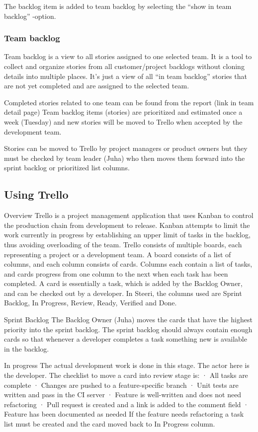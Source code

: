 \documentclass[english]{tktltiki2}
\theoremstyle{definition}
\theoremstyle{remark}
\begin{document}
The backlog item is added to team backlog by selecting the “show in team backlog” -option.

\subsubsection{Team backlog}
Team backlog is a view to all stories assigned to one selected team. It is a tool to collect and organize stories from all customer/project backlogs without cloning details into multiple places. It’s just a view of all “in team backlog” stories that are not yet completed and are assigned to the selected team.

Completed stories related to one team can be found from the report (link in team detail page)
Team backlog items (stories) are prioritized and estimated once a week (Tuesday) and new stories will be moved to Trello when accepted by the development team.

Stories can be moved to Trello by project managers or product owners but they must be checked by team leader (Juha) who then moves them forward into the sprint backlog or prioritized list columns.

\subsection{Using Trello}

Overview
Trello is a project management application that uses Kanban to control the production chain from development to release. Kanban attempts to limit the work currently in progress by establishing an upper limit of tasks in the backlog, thus avoiding overloading of the team. Trello consists of multiple boards, each representing a project or a development team. A board consists of a list of columns, and each column consists of cards. Columns each contain a list of tasks, and cards progress from one column to the next when each task has been completed. A card is essentially a task, which is added by the Backlog Owner, and can be checked out by a developer. In Steeri, the columns used are Sprint Backlog, In Progress, Review, Ready, Verified and Done. 

Sprint Backlog
The Backlog Owner (Juha) moves the cards that have the highest priority into the sprint backlog. The sprint backlog should always contain enough cards so that whenever a developer completes a task something new is available in the backlog.

In progress
The actual development work is done in this stage. The actor here is the developer. The checklist to move a card into review stage is:
·       All tasks are complete
·       Changes are pushed to a feature-specific branch
·       Unit tests are written and pass in the CI server
·       Feature is well-written and does not need refactoring
·       Pull request is created and a link is added to the comment field
·       Feature has been documented as needed
If the feature needs refactoring a task list must be created and the card moved back to In Progress column.
\end{document}
